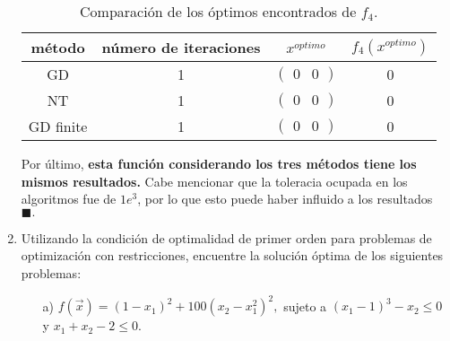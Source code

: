 \documentclass[11pt,letterpaper]{article}
\newcommand{\fin}{$\blacksquare.$}
\begin{document}
\begin{enumerate}
\begin{table}[h]
\centering
\begin{tabular}{c|c|c|c}
\hline \hline
método &número de iteraciones &$x^{optimo}$ & $f_4(x^{optimo})$ \\ \hline \hline
GD &1 &$\begin{pmatrix}
0 & 0
\end{pmatrix}$ & 0\\
NT &1&$\begin{pmatrix}
0 & 0
\end{pmatrix}$ & 0\\
GD finite & 1 &$\begin{pmatrix}
0 & 0
\end{pmatrix}$ & 0 \\ \hline \hline
\end{tabular}
\caption{Comparación de los óptimos encontrados de $f_4$.}
\end{table}
Por último, \textbf{esta función considerando los tres métodos tiene los mismos resultados.} Cabe mencionar que la toleracia ocupada en los algoritmos fue de $1e^3$, por lo que esto puede haber influido a los resultados\ \ \fin

\item Utilizando la condición de optimalidad de primer orden para problemas de optimización con restricciones, encuentre la solución óptima de los siguientes problemas:
\begin{itemize}
\item[a)] $f(\overrightarrow{x}) = (1-x_1)^2+100(x_2-x_1^2)^2,$ sujeto a $(x_1-1)^3-x_2\leq 0$ y $x_1+x_2-2 \leq 0$.


\end{itemize}
\end{enumerate}
\end{document}
